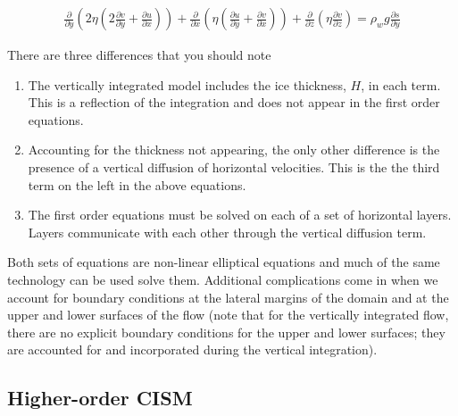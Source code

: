 \begin{align*}
\frac{\partial}{\partial y}\left ( 2 \eta 
\left(2\frac{\partial v}{\partial y}+\frac{\partial u}{\partial x}\right)\right)
+\frac{\partial}{\partial x}\left(\eta \left(
\frac{\partial u}{\partial y}+\frac{\partial v}{\partial x}\right)\right)
+\frac{\partial}{\partial z}\left(\eta \frac{\partial v}{\partial z}\right)
=\rho_w g \frac{\partial s}{\partial y}
\end{align*}

There are three differences that you should note
\begin{enumerate}
\item  The vertically integrated model includes the ice thickness, $H$, in each term. This is a reflection of the integration and does not appear in the first order equations.
\item  Accounting for the thickness not appearing, the only other difference is the presence of a vertical diffusion of horizontal velocities. This is the the third term on the left in the above equations.
\item  The first order equations must be solved on each of a set of horizontal layers. Layers communicate with each other through the vertical diffusion term.
\end{enumerate}

Both sets of equations are non-linear elliptical equations and much of the same technology can be used solve them. Additional complications come in when we account for boundary conditions at the lateral margins of the domain and at the upper and lower surfaces of the flow (note that for the vertically integrated flow, there are no explicit boundary conditions for the upper and lower surfaces; they are accounted for and incorporated during the vertical integration).

\subsection{Higher-order CISM}


